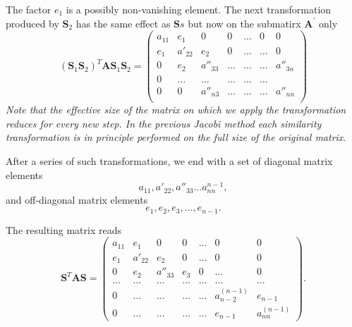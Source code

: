 \documentclass[%
oneside,                 %
final,                   %
10pt]{article}
\begin{document}
The factor  $e_1$ is a possibly non-vanishing element. The next
transformation produced by $\mathbf{S}_2$ has the same effect as  $\mathbf{S}s$ but now on the submatirx $\mathbf{A^{'}}$ only
\[
   \left (\mathbf{S}_{1}\mathbf{S}_{2} \right )^{T} \mathbf{A}\mathbf{S}_{1} \mathbf{S}_{2}
 = \left( \begin{array}{ccccccc} a_{11} & e_1 & 0   & 0    & \dots  &0     & 0 \\
                                e_1 & a'_{22} &e_2  & 0   & \dots  &\dots &0 \\
                                0   & e_2 &a''_{33}  & \dots    & \dots  &\dots &a''_{3n} \\
                                0   & \dots &\dots & \dots    & \dots  &\dots & \\
                                0   & 0 &a''_{n3}  & \dots    & \dots  &\dots &a''_{nn} \\
             \end{array} \right) 
\]
\emph{Note that the effective size of the matrix on which we apply the transformation reduces for every new step. In the previous Jacobi method each similarity transformation is in principle performed on the full size of the original matrix}.

After a series of such transformations, we end with a set of diagonal
matrix elements
\[
  a_{11}, a'_{22}, a''_{33}\dots a^{n-1}_{nn},
\]
and off-diagonal matrix elements 
\[
   e_1, e_2,e_3,  \dots, e_{n-1}.
\]

The resulting matrix reads
\[
\mathbf{S}^{T} \mathbf{A} \mathbf{S} = 
    \left( \begin{array}{ccccccc} a_{11} & e_1 & 0   & 0    & \dots  &0     & 0 \\
                                e_1 & a'_{22} & e_2 & 0    & \dots  &0     &0 \\
                                0   & e_2 & a''_{33} & e_3  &0       &\dots & 0\\
                                \dots  & \dots & \dots & \dots  &\dots      &\dots & \dots\\
                                0   & \dots & \dots & \dots  &\dots       &a^{(n-1)}_{n-2} & e_{n-1}\\
                                0   & \dots & \dots & \dots  &\dots       &e_{n-1} & a^{(n-1)}_{nn}
             \end{array} \right) .
\]
\end{document}
